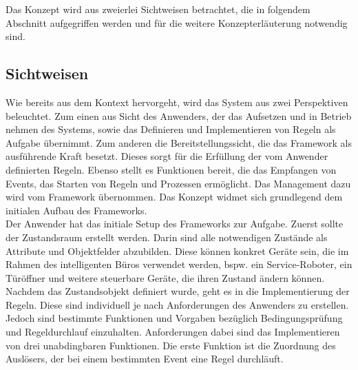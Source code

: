         Das Konzept wird aus zweierlei Sichtweisen betrachtet, die in folgendem Abschnitt aufgegriffen werden und für die weitere 
        Konzepterläuterung notwendig sind.
    
    \subsection{Sichtweisen}
    \label{subsec:sichtweisen}
        Wie bereits aus dem Kontext hervorgeht, wird das System aus zwei Perspektiven beleuchtet. Zum einen aus Sicht des Anwenders, 
        der das Aufsetzen und in Betrieb nehmen des Systems, sowie das Definieren und Implementieren von Regeln als 
        Aufgabe übernimmt. Zum anderen die 
        Bereitstellungssicht, die das Framework als ausführende Kraft besetzt. Dieses sorgt für die Erfüllung der vom 
        Anwender definierten Regeln. Ebenso stellt es Funktionen bereit, die das Empfangen von Events, das Starten 
        von Regeln und Prozessen ermöglicht. Das Management dazu wird vom Framework übernommen. 
        Das Konzept widmet sich grundlegend dem initialen Aufbau des Frameworks. 
        \\
        \linebreak
        Der Anwender hat das initiale Setup des Frameworks zur Aufgabe. Zuerst sollte der Zustandsraum erstellt werden. 
        Darin sind alle notwendigen Zustände als Attribute und Objektfelder abzubilden. Diese können konkret Geräte sein, die im Rahmen des 
        intelligenten Büros verwendet werden, bspw. ein Service-Roboter, ein Türöffner und weitere steuerbare Geräte, die 
        ihren Zustand ändern können. Nachdem das Zustandsobjekt 
        definiert wurde, geht es in die Implementierung der Regeln. Diese sind individuell je nach 
        Anforderungen des Anwenders zu erstellen. Jedoch sind bestimmte Funktionen und Vorgaben bezüglich Bedingungsprüfung 
        und Regeldurchlauf einzuhalten. Anforderungen dabei sind das Implementieren von drei unabdingbaren Funktionen. 
        Die erste Funktion ist die Zuordnung des Auslösers, der bei einem bestimmten Event eine Regel durchläuft. 
